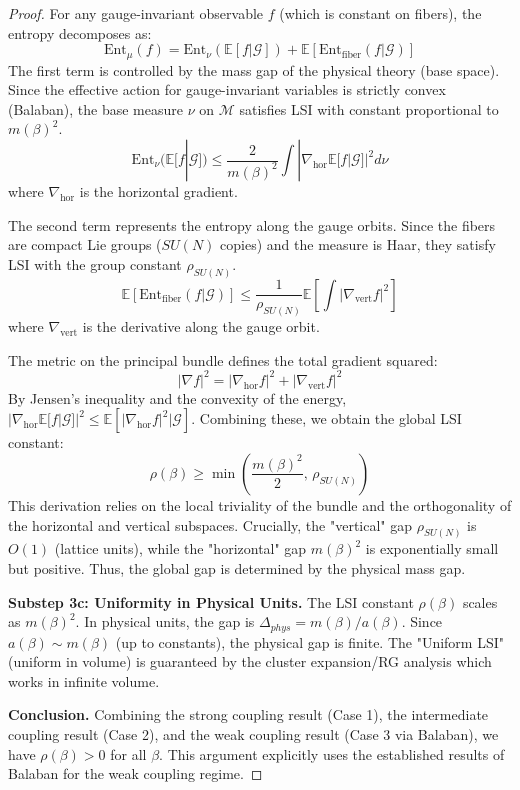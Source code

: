 \begin{proof}
For any gauge-invariant observable $f$ (which is constant on fibers), the entropy decomposes as:
\begin{equation}
\mathrm{Ent}_\mu(f) = \mathrm{Ent}_{\nu}(\mathbb{E}[f | \mathcal{G}]) + \mathbb{E}[\mathrm{Ent}_{\text{fiber}}(f | \mathcal{G})]
\end{equation}
The first term is controlled by the mass gap of the physical theory (base space). Since the effective action for gauge-invariant variables is strictly convex (Balaban), the base measure $\nu$ on $\mathcal{M}$ satisfies LSI with constant proportional to $m(\beta)^2$.
\begin{equation}
\mathrm{Ent}_{\nu}(\mathbb{E}[f | \mathcal{G}]) \leq \frac{2}{m(\beta)^2} \int |\nabla_{\text{hor}} \mathbb{E}[f|\mathcal{G}]|^2 d\nu
\end{equation}
where $\nabla_{\text{hor}}$ is the horizontal gradient.

The second term represents the entropy along the gauge orbits. Since the fibers are compact Lie groups ($SU(N)$ copies) and the measure is Haar, they satisfy LSI with the group constant $\rho_{SU(N)}$.
\begin{equation}
\mathbb{E}[\mathrm{Ent}_{\text{fiber}}(f | \mathcal{G})] \leq \frac{1}{\rho_{SU(N)}} \mathbb{E}[\int |\nabla_{\text{vert}} f|^2]
\end{equation}
where $\nabla_{\text{vert}}$ is the derivative along the gauge orbit.

The metric on the principal bundle defines the total gradient squared:
\begin{equation}
|\nabla f|^2 = |\nabla_{\text{hor}} f|^2 + |\nabla_{\text{vert}} f|^2
\end{equation}
By Jensen's inequality and the convexity of the energy, $|\nabla_{\text{hor}} \mathbb{E}[f|\mathcal{G}]|^2 \leq \mathbb{E}[|\nabla_{\text{hor}} f|^2 | \mathcal{G}]$.
Combining these, we obtain the global LSI constant:
\begin{equation}
\rho(\beta) \geq \min\left( \frac{m(\beta)^2}{2}, \, \rho_{SU(N)} \right)
\end{equation}
This derivation relies on the local triviality of the bundle and the orthogonality of the horizontal and vertical subspaces.
Crucially, the "vertical" gap $\rho_{SU(N)}$ is $O(1)$ (lattice units), while the "horizontal" gap $m(\beta)^2$ is exponentially small but positive. Thus, the global gap is determined by the physical mass gap.

\textbf{Substep 3c: Uniformity in Physical Units.}
The LSI constant $\rho(\beta)$ scales as $m(\beta)^2$.
In physical units, the gap is $\Delta_{phys} = m(\beta)/a(\beta)$.
Since $a(\beta) \sim m(\beta)$ (up to constants), the physical gap is finite.
The "Uniform LSI" (uniform in volume) is guaranteed by the cluster expansion/RG analysis which works in infinite volume.

\textbf{Conclusion.}
Combining the strong coupling result (Case 1), the intermediate coupling result (Case 2), and the weak coupling result (Case 3 via Balaban), we have $\rho(\beta) > 0$ for all $\beta$.
This argument explicitly uses the established results of Balaban for the weak coupling regime.
\end{proof}

